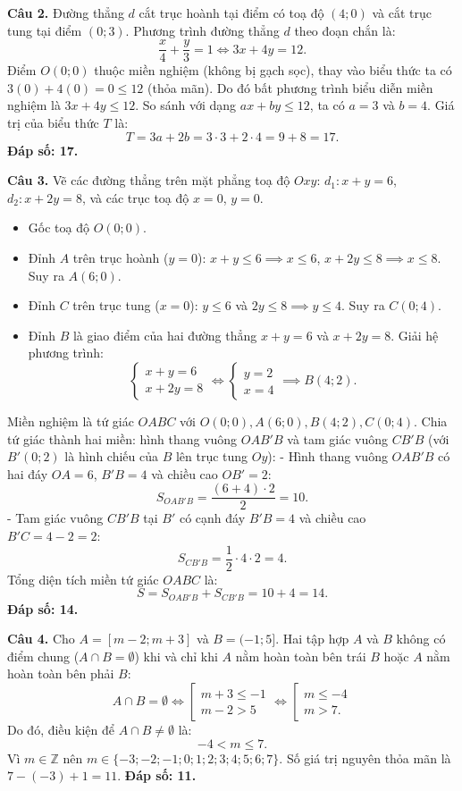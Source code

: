 \documentclass[12pt,a4paper]{article}
\begin{document}
\textbf{Câu 2.} Đường thẳng $d$ cắt trục hoành tại điểm có toạ độ $(4; 0)$ và cắt trục tung tại điểm $(0; 3)$.
Phương trình đường thẳng $d$ theo đoạn chắn là:
\[
\frac{x}{4} + \frac{y}{3} = 1 \iff 3x + 4y = 12.
\]
Điểm $O(0; 0)$ thuộc miền nghiệm (không bị gạch sọc), thay vào biểu thức ta có $3(0) + 4(0) = 0 \le 12$ (thỏa mãn).
Do đó bất phương trình biểu diễn miền nghiệm là $3x + 4y \le 12$.
So sánh với dạng $ax + by \le 12$, ta có $a = 3$ và $b = 4$.
Giá trị của biểu thức $T$ là:
\[
T = 3a + 2b = 3 \cdot 3 + 2 \cdot 4 = 9 + 8 = 17.
\]
\textbf{Đáp số: 17.}

\textbf{Câu 3.} Vẽ các đường thẳng trên mặt phẳng toạ độ $Oxy$:
$d_1\colon x + y = 6$, $d_2\colon x + 2y = 8$, và các trục toạ độ $x = 0$, $y = 0$.
\begin{itemize}[leftmargin=0.5cm, itemsep=1pt, topsep=1pt]
    \item Gốc toạ độ $O(0; 0)$.
    \item Đỉnh $A$ trên trục hoành ($y = 0$): $x + y \le 6 \implies x \le 6$, $x + 2y \le 8 \implies x \le 8$. Suy ra $A(6; 0)$.
    \item Đỉnh $C$ trên trục tung ($x = 0$): $y \le 6$ và $2y \le 8 \implies y \le 4$. Suy ra $C(0; 4)$.
    \item Đỉnh $B$ là giao điểm của hai đường thẳng $x + y = 6$ và $x + 2y = 8$. Giải hệ phương trình:
    \[
    \begin{cases} x + y = 6 \\ x + 2y = 8 \end{cases} \iff \begin{cases} y = 2 \\ x = 4 \end{cases} \implies B(4; 2).
    \]
\end{itemize}
Miền nghiệm là tứ giác $OABC$ với $O(0; 0), A(6; 0), B(4; 2), C(0; 4)$.
Chia tứ giác thành hai miền: hình thang vuông $OAB'B$ và tam giác vuông $CB'B$ (với $B'(0; 2)$ là hình chiếu của $B$ lên trục tung $Oy$):
- Hình thang vuông $OAB'B$ có hai đáy $OA = 6$, $B'B = 4$ và chiều cao $OB' = 2$:
  \[
  S_{OAB'B} = \frac{(6 + 4) \cdot 2}{2} = 10.
  \]
- Tam giác vuông $CB'B$ tại $B'$ có cạnh đáy $B'B = 4$ và chiều cao $B'C = 4 - 2 = 2$:
  \[
  S_{CB'B} = \frac{1}{2} \cdot 4 \cdot 2 = 4.
  \]
Tổng diện tích miền tứ giác $OABC$ là:
\[
S = S_{OAB'B} + S_{CB'B} = 10 + 4 = 14.
\]
\textbf{Đáp số: 14.}

\textbf{Câu 4.} Cho $A = [m - 2; m + 3]$ và $B = (-1; 5]$.
Hai tập hợp $A$ và $B$ không có điểm chung ($A \cap B = \emptyset$) khi và chỉ khi $A$ nằm hoàn toàn bên trái $B$ hoặc $A$ nằm hoàn toàn bên phải $B$:
\[
A \cap B = \emptyset \iff \left[\begin{array}{l} m + 3 \le -1 \\ m - 2 > 5 \end{array}\right. \iff \left[\begin{array}{l} m \le -4 \\ m > 7. \end{array}\right.
\]
Do đó, điều kiện để $A \cap B \ne \emptyset$ là:
\[
-4 < m \le 7.
\]
Vì $m \in \mathbb{Z}$ nên $m \in \{-3; -2; -1; 0; 1; 2; 3; 4; 5; 6; 7\}$.
Số giá trị nguyên thỏa mãn là $7 - (-3) + 1 = 11$. \textbf{Đáp số: 11.}
\end{document}
